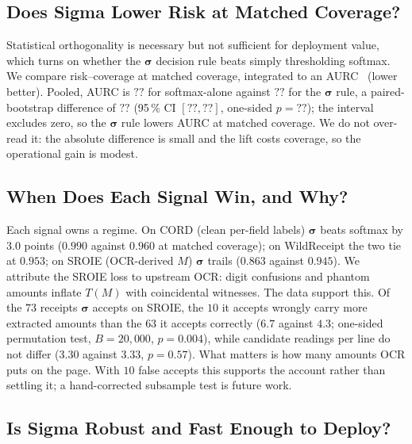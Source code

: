 \documentclass[conference]{IEEEtran}
\newcommand{\rcAURCsoft}{??}
\newcommand{\rcAURCsig}{??}
\newcommand{\rcAURCd}{??}
\newcommand{\rcAURCdLo}{??}
\newcommand{\rcAURCdHi}{??}
\newcommand{\rcAURCp}{??}
\let\IEEEsigma\sigma
\DeclareRobustCommand{\sigma}{{\boldsymbol{\IEEEsigma}}}
\begin{document}
\subsection{Does Sigma Lower Risk at Matched Coverage?}
\label{sec:results-riskcov}

\noindent Statistical orthogonality is necessary but not sufficient for
deployment value, which turns on whether the $\sigma$ decision rule beats simply
thresholding softmax. We compare risk--coverage at matched coverage, integrated
to an AURC~\cite{geifman2019aurc} (lower better). Pooled, AURC is
$\rcAURCsoft$ for softmax-alone against $\rcAURCsig$ for the $\sigma$ rule, a
paired-bootstrap difference of $\rcAURCd$ (95\,\% CI
$[\rcAURCdLo,\rcAURCdHi]$, one-sided $p{=}\rcAURCp$); the interval excludes
zero, so the $\sigma$ rule lowers AURC at matched coverage. We do not
over-read it: the absolute difference is
small and the lift costs coverage, so the operational gain is modest.

\subsection{When Does Each Signal Win, and Why?}
\label{sec:results-regime}

\noindent Each signal owns a regime. On CORD (clean per-field labels) $\sigma$
beats softmax by $3.0$ points ($0.990$ against $0.960$ at matched coverage);
on WildReceipt the two tie at $0.953$; on SROIE (OCR-derived $M$) $\sigma$
trails ($0.863$ against $0.945$). We attribute the SROIE loss to upstream OCR: digit confusions and phantom amounts inflate
$T(M)$ with coincidental witnesses. The data support this. Of the $73$ receipts
$\sigma$ accepts on SROIE, the $10$ it accepts wrongly carry more extracted
amounts than the $63$ it accepts correctly ($6.7$ against $4.3$; one-sided
permutation test, $B{=}20{,}000$, $p{=}0.004$), while candidate readings per
line do not differ ($3.30$ against $3.33$, $p{=}0.57$). What matters is how
many amounts OCR puts on the page. With
$10$ false accepts this supports the account rather than settling it; a
hand-corrected subsample test is future work.

\subsection{Is Sigma Robust and Fast Enough to Deploy?}
\label{sec:results-robust}
\end{document}
